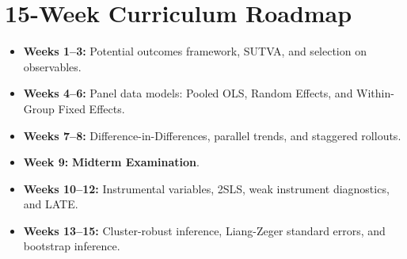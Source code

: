 \documentclass[11pt, a4paper]{article}
\begin{document}
\section*{15-Week Curriculum Roadmap}
\begin{itemize}\setlength{\itemsep}{2pt}
    \item \textbf{Weeks 1--3:} Potential outcomes framework, SUTVA, and selection on observables.
    \item \textbf{Weeks 4--6:} Panel data models: Pooled OLS, Random Effects, and Within-Group Fixed Effects.
    \item \textbf{Weeks 7--8:} Difference-in-Differences, parallel trends, and staggered rollouts.
    \item \textbf{Week 9:} \textbf{Midterm Examination}.
    \item \textbf{Weeks 10--12:} Instrumental variables, 2SLS, weak instrument diagnostics, and LATE.
    \item \textbf{Weeks 13--15:} Cluster-robust inference, Liang-Zeger standard errors, and bootstrap inference.
\end{itemize}
\end{document}
